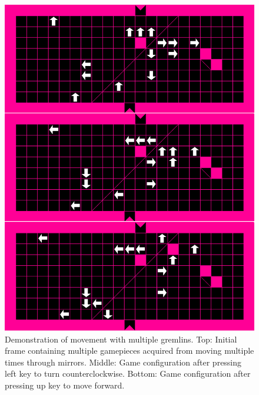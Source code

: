 \documentclass{scrreprt}
\begin{document}
		\begin{figure}[!ht]
			\centering
			\includegraphics[width=\columnwidth]{multi}
			\caption{
				Demonstration of movement with multiple gremlins.
				Top: Initial frame containing multiple gamepieces acquired from moving multiple times through mirrors.
				Middle: Game configuration after pressing left key to turn counterclockwise.
				Bottom: Game configuration after pressing up key to move forward.
			}
			\label{fig:multi}
		\end{figure}
	
\end{document}
